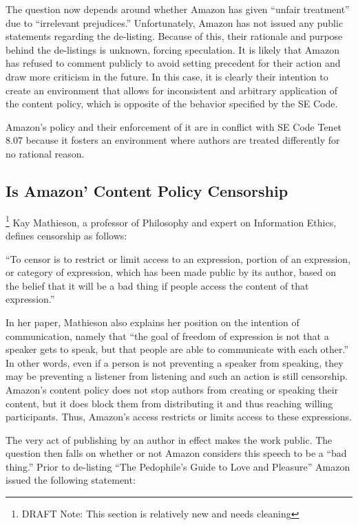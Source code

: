\documentclass[11pt]{article}
\begin{document}
\begin{multicols}{2}
The question now depends around whether Amazon has given ``unfair treatment'' due to ``irrelevant prejudices.''  Unfortunately, Amazon has not issued any public statements regarding the de-listing.  Because of this, their rationale and purpose behind the de-listings is unknown, forcing speculation.  It is likely that Amazon has refused to comment publicly to avoid setting precedent for their action and draw more criticism in the future.  In this case, it is clearly their intention to create an environment that allows for inconsistent and arbitrary application of the content policy, which is opposite of the behavior specified by the SE Code.

Amazon's policy and their enforcement of it are in conflict with SE Code Tenet 8.07 because it fosters an environment where authors are treated differently for no rational reason.

\subsection{Is Amazon' Content Policy Censorship} \footnote{DRAFT Note: This section is relatively new and needs cleaning}
Kay Mathieson, a professor of Philosophy and expert on Information Ethics, defines censorship as follows:

``To censor is to restrict or limit access to an expression, portion of an expression, or category of expression, which has been made public by its author, based on the belief that it will be a bad thing if people access the content of that expression.'' \cite{MathiesenCensorship}

In her paper, Mathieson also explains her position on the intention of communication, namely that ``the goal of freedom of expression is not that a speaker gets to speak, but that people are able to communicate with each other.''  In other words, even if a person is not preventing a speaker from speaking, they may be preventing a listener from listening and such an action is still censorship.  Amazon's content policy does not stop authors from creating or speaking their content, but it does block them from distributing it and thus reaching willing participants.  Thus, Amazon's access restricts or limits access to these expressions.

The very act of publishing by an author in effect makes the work public.  The question then falls on whether or not Amazon considers this speech to be a ``bad thing.''  Prior to de-listing ``The Pedophile's Guide to Love and Pleasure'' Amazon issued the following statement:


\end{multicols}
\end{document}
